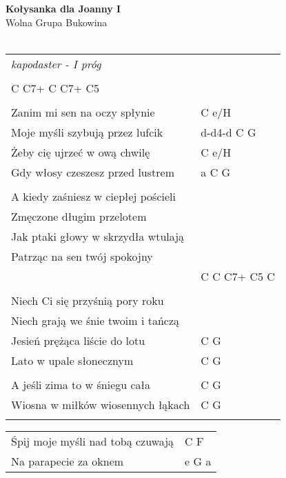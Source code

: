 \documentclass[a5paper]{article}
\begin{document}


\noindent
\fontsize{12pt}{15pt}\selectfont
\textbf{Kołysanka dla Joanny I} \\
\fontsize{8pt}{10pt}\selectfont
Wolna Grupa Bukowina \\ \\
\fontsize{10pt}{12pt}\selectfont
{}
\begin{tabular}{@{}p{8.00cm}p{3cm}@{}}
\noindent
\emph{kapodaster - I próg} \\ \\

C C7+ C C7+ C5 \\ \\

Zanim mi sen na oczy spłynie & C e/H \\
Moje myśli szybują przez lufcik & d-d4-d C G \\
Żeby cię ujrzeć w ową chwilę & C e/H \\
Gdy włosy czeszesz przed lustrem & a C G \\ \\

A kiedy zaśniesz w ciepłej pościeli \\
Zmęczone długim przelotem \\
Jak ptaki głowy w skrzydła wtulają \\
Patrząc na sen twój spokojny \\
& C C C7+ C5 C \\ \\

Niech Ci się przyśnią pory roku \\
Niech grają we śnie twoim i tańczą \\
Jesień prężąca liście do lotu & C G \\
Lato w upale słonecznym & C G \\ \\

A jeśli zima to w śniegu cała & C G \\
Wiosna w miłków wiosennych łąkach & C G \\ \\
\end{tabular}

\noindent
\begin{tabular}{@{}p{7.00cm}p{3cm}@{}}
Śpij moje myśli nad tobą czuwają & C F \\
Na parapecie za oknem & e G a
\end{tabular}
\end{document}
